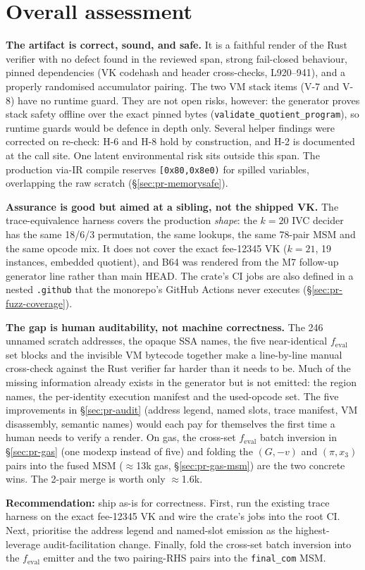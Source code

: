 \section{Overall assessment}
\label{sec:pr-overall}

\textbf{The artifact is correct, sound, and safe.} It is a faithful
render of the Rust verifier with no defect found in the reviewed
span, strong fail-closed behaviour, pinned dependencies (VK codehash
and header cross-checks, L920--941), and a properly randomised
accumulator pairing. The two VM stack items (V-7 and V-8) have no
runtime guard. They are not open risks, however: the generator
proves stack safety offline over the exact pinned bytes
(\texttt{validate\_\allowbreak{}quotient\_\allowbreak{}program}), so runtime guards would be
defence in depth only. Several helper findings were corrected on
re-check: H-6 and H-8 hold by construction, and H-2 is documented at
the call site. One latent environmental risk sits outside this span.
The production via-IR compile reserves \texttt{[0x80,0x8e0)} for
spilled variables, overlapping the raw scratch
(\S\ref{sec:pr-memorysafe}).

\textbf{Assurance is good but aimed at a sibling, not the shipped
VK.} The trace-equivalence harness covers the production
\emph{shape}: the $k=20$ IVC decider has the same 18/6/3 permutation,
the same lookups, the same 78-pair MSM and the same opcode mix. It
does not cover the exact fee-12345 VK ($k=21$, 19 instances,
embedded quotient), and B64 was rendered from the M7 follow-up
generator line rather than main HEAD. The crate's CI jobs are also
defined in a nested \texttt{.github} that the monorepo's GitHub
Actions never executes (\S\ref{sec:pr-fuzz-coverage}).

\textbf{The gap is human auditability, not machine correctness.} The
246 unnamed scratch addresses, the opaque SSA names, the five
near-identical $f_\text{eval}$ set blocks and the invisible VM
bytecode together make a line-by-line manual cross-check against
the Rust verifier far harder than it needs to be. Much of the
missing information already exists in the generator but is not
emitted: the region names, the per-identity execution manifest and
the used-opcode set. The five improvements in
\S\ref{sec:pr-audit} (address legend, named slots, trace manifest,
VM disassembly, semantic names) would each pay for themselves the
first time a human needs to verify a render. On gas, the
cross-set $f_\text{eval}$ batch inversion in \S\ref{sec:pr-gas}
(one modexp instead of five) and folding the $(G,-v)$ and
$(\pi,x_3)$ pairs into the fused MSM ($\approx$13k gas,
\S\ref{sec:pr-gas-msm}) are the two concrete wins. The 2-pair merge
is worth only $\approx$1.6k.

\textbf{Recommendation:} ship as-is for correctness. First, run the
existing trace harness on the exact fee-12345 VK and wire the crate's
jobs into the root CI. Next, prioritise the address legend and
named-slot emission as the highest-leverage audit-facilitation
change. Finally, fold the cross-set batch inversion into the
$f_\text{eval}$ emitter and the two pairing-RHS pairs into the
\texttt{final\_com} MSM.
